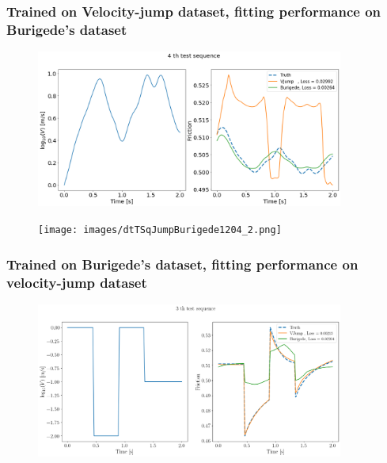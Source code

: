 \subsubsection{Trained on Velocity-jump dataset, 
fitting performance on Burigede's dataset}
\begin{figure}[H]
    \centering
    \includegraphics[width=0.9\textwidth]{images/dtTSqJumpBurigede1204_1.png}
    \label{fig:dtTSqJumpBurigede1204_1}
\end{figure}

\begin{figure}[H]
    \centering
    \texttt{[image: images/dtTSqJumpBurigede1204\_2.png]}
    \label{fig:dtTSqJumpBurigede1204_2}
\end{figure}

\subsubsection{Trained on Burigede's dataset, 
fitting performance on velocity-jump dataset}
\begin{figure}[H]
    \centering
    \includegraphics[width=0.9\textwidth]{images/dtTSqBurigedeJump1204_1.png}
    \label{fig:dtTSqBurigedeJump1204_1}
\end{figure}

